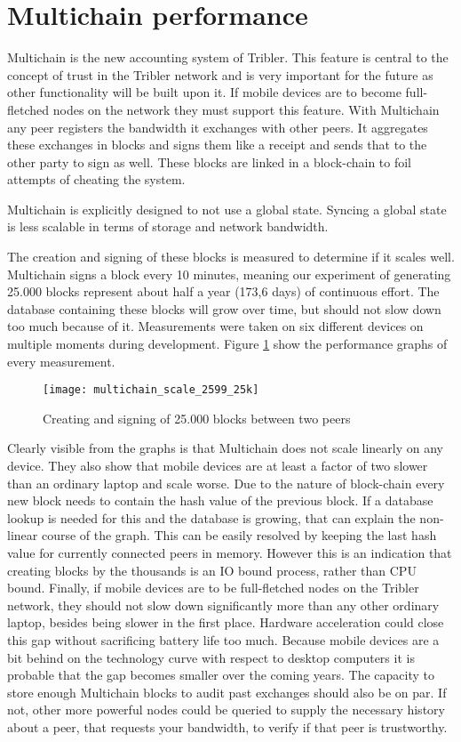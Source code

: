 \section{Multichain performance}
Multichain is the new accounting system of Tribler.
This feature is central to the concept of trust in the Tribler network and is very important for the future as other functionality will be built upon it.
If mobile devices are to become full-fletched nodes on the network they must support this feature.
With Multichain any peer registers the bandwidth it exchanges with other peers.
It aggregates these exchanges in blocks and signs them like a receipt and sends that to the other party to sign as well.
These blocks are linked in a block-chain to foil attempts of cheating the system.

Multichain is explicitly designed to not use a global state.
Syncing a global state is less scalable in terms of storage and network bandwidth.

The creation and signing of these blocks is measured to determine if it scales well.
Multichain signs a block every 10 minutes, meaning our experiment of generating 25.000 blocks represent about half a year (173,6 days) of continuous effort.
The database containing these blocks will grow over time, but should not slow down too much because of it.
Measurements were taken on six different devices on multiple moments during development.
Figure \ref{fig:multichain_25} show the performance graphs of every measurement.
\begin{figure}[H]
	\centering
	\texttt{[image: multichain\_scale\_2599\_25k]}
	\caption{Creating and signing of 25.000 blocks between two peers}
	\label{fig:multichain_25}
\end{figure}
Clearly visible from the graphs is that Multichain does not scale linearly on any device.
They also show that mobile devices are at least a factor of two slower than an ordinary laptop and scale worse.
Due to the nature of block-chain every new block needs to contain the hash value of the previous block.
If a database lookup is needed for this and the database is growing, that can explain the non-linear course of the graph.
This can be easily resolved by keeping the last hash value for currently connected peers in memory.
However this is an indication that creating blocks by the thousands is an IO bound process, rather than CPU bound.
Finally, if mobile devices are to be full-fletched nodes on the Tribler network, they should not slow down significantly more than any other ordinary laptop, besides being slower in the first place.
Hardware acceleration could close this gap without sacrificing battery life too much.
Because mobile devices are a bit behind on the technology curve with respect to desktop computers it is probable that the gap becomes smaller over the coming years.
The capacity to store enough Multichain blocks to audit past exchanges should also be on par.
If not, other more powerful nodes could be queried to supply the necessary history about a peer, that requests your bandwidth, to verify if that peer is trustworthy.


